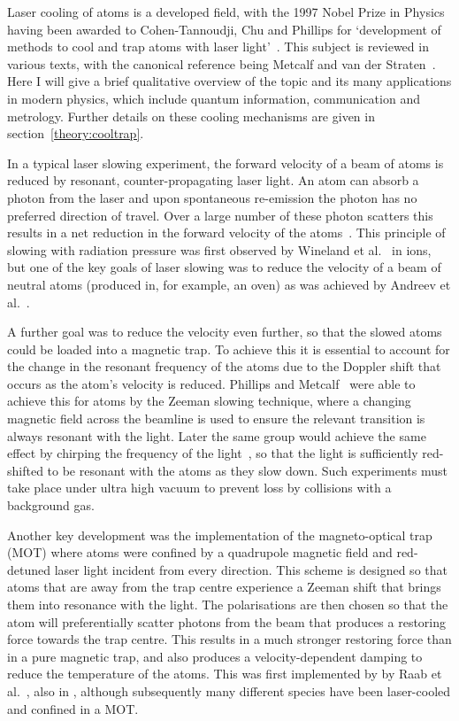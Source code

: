 Laser cooling of atoms is a developed field, with the 1997 Nobel Prize in
Physics having been awarded to Cohen-Tannoudji, Chu and Phillips for
`development of methods to cool and trap atoms with laser
light'~\cite{RevModPhys.70.721}. This subject is reviewed in various texts, with
the canonical reference being Metcalf and van der Straten~\cite{Metcalf1999}.
Here I will give a brief qualitative overview of the topic and its many
applications in modern physics, which include quantum information,
communication and metrology. Further details on these cooling mechanisms are
given in section~\ref{theory:cooltrap}.

In a typical laser slowing experiment, the forward velocity of a beam of atoms
is reduced by resonant, counter-propagating laser light. An atom can absorb a
photon from the laser and upon spontaneous re-emission the photon has no
preferred direction of travel. Over a large number of these photon scatters this
results in a net reduction in the forward velocity of the
atoms~\cite{PhysRevLett.40.1639}. This principle of slowing with radiation
pressure was first observed by Wineland et al.~\cite{PhysRevLett.40.1639} in
\Mg{} ions, but one of the key goals of laser slowing was to reduce the
velocity of a beam of neutral atoms (produced in, for example, an oven) as was
achieved by Andreev et al.~\cite{Andreev1981}.

A further goal was to reduce the velocity even further, so that the slowed atoms
could be loaded into a magnetic trap.  To achieve this it is essential to
account for the change in the resonant frequency of the atoms due to the
Doppler shift that occurs as the atom's velocity is reduced. Phillips and
Metcalf~\cite{PhysRevLett.48.596} were able to achieve this for \Na{} atoms by
the Zeeman slowing technique, where a changing magnetic field across the
beamline is used to ensure the relevant transition is always resonant with the
light. Later the same group would achieve the same effect by chirping the
frequency of the light~\cite{Prodan1984}, so that the light is sufficiently
red-shifted to be resonant with the atoms as they slow down.  Such experiments
must take place under ultra high vacuum to prevent loss by collisions with a
background gas.

Another key development was the implementation of the magneto-optical trap
(MOT) where atoms were confined by a quadrupole magnetic field and red-detuned
laser light incident from every direction. This scheme is designed so that
atoms that are away from the trap centre experience a Zeeman shift that brings
them into resonance with the light. The polarisations are then chosen so that
the atom will preferentially scatter photons from the beam that produces a
restoring force towards the trap centre. This results in a much stronger
restoring force than in a pure magnetic trap, and also produces a
velocity-dependent damping to reduce the temperature of the atoms. This was
first implemented by by Raab et al.~\cite{PhysRevLett.59.2631}, also in \Na{},
although subsequently many different species have been laser-cooled and
confined in a MOT.

